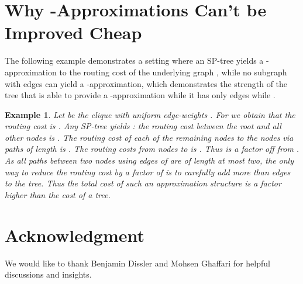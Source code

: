 \documentclass[11pt]{article}
\newtheorem{example}[theorem]{Example}
\begin{document}
\section{Why -Approximations Can't be Improved Cheap}\label{sec:cant}
The following example demonstrates a setting where an SP-tree yields a -approximation to the routing cost of the underlying graph , while no subgraph  with  edges can yield a -approximation, which  demonstrates the strength of the tree that is able to provide a -approximation while it has only  edges while . 
\begin{example} 
Let  be the clique with uniform edge-weights . For  we obtain that the routing cost  is . Any SP-tree  yields : the routing cost between the root  and all other nodes is . The routing cost of each of the remaining  nodes  to the nodes  via paths of length  is . The routing costs from nodes  to  is . Thus  is a factor  off from . As all paths between two nodes using edges of  are of length at most two, the only way to reduce the routing cost by a factor of  is to carefully add more than  edges to the tree. Thus the total cost of such an approximation structure is a factor  higher than the cost of a tree. 
\end{example}


\section*{Acknowledgment}
We would like to thank Benjamin Dissler and Mohsen Ghaffari for helpful discussions and insights.



\end{document}
